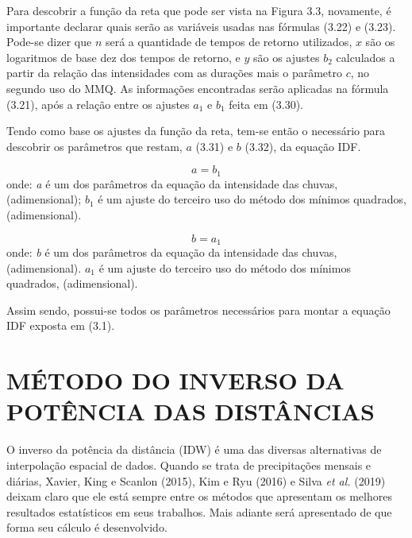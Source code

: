 \newpage

Para descobrir a função da reta que pode ser vista na Figura 3.3, novamente, é importante declarar quais serão as variáveis usadas nas fórmulas (3.22) e (3.23). Pode-se dizer que $n$ será a quantidade de tempos de retorno utilizados, $x$ são os logaritmos de base dez dos tempos de retorno, e $y$ são os ajustes $b_2$ calculados a partir da relação das intensidades com as durações mais o parâmetro $c$, no segundo uso do MMQ. As informações encontradas serão aplicadas na fórmula (3.21), após a relação entre os ajustes $a_1$ e $b_1$ feita em (3.30).

Tendo como base os ajustes da função da reta, tem-se então o necessário para descobrir os parâmetros que restam, $a$ (3.31) e $b$ (3.32), da equação IDF.\bigskip

\begin{equation}
a = b_1
\end{equation}
\newline
onde:
\newline
\textit{a} é um dos parâmetros da equação da intensidade das chuvas, (adimensional);
\newline
$b_1$ é um ajuste do terceiro uso do método dos mínimos quadrados, (adimensional).\bigskip

\begin{equation}
b = a_1
\end{equation}
\newline
onde:
\newline
\textit{b} é um dos parâmetros da equação da intensidade das chuvas, (adimensional).
\newline
$a_1$ é um ajuste do terceiro uso do método dos mínimos quadrados, (adimensional).\bigskip

Assim sendo, possui-se todos os parâmetros necessários para montar a equação IDF exposta em (3.1).

\newpage

\section{MÉTODO DO INVERSO DA POTÊNCIA DAS DISTÂNCIAS}\bigskip

O inverso da potência da distância (IDW) é uma das diversas alternativas de interpolação espacial de dados. Quando se trata de precipitações mensais e diárias, Xavier, King e Scanlon (2015), Kim e Ryu (2016) e Silva \textit{et al.} (2019) deixam claro que ele está sempre entre os métodos que apresentam os melhores resultados estatísticos em seus trabalhos. Mais adiante será apresentado de que forma seu cálculo é desenvolvido.\bigskip

